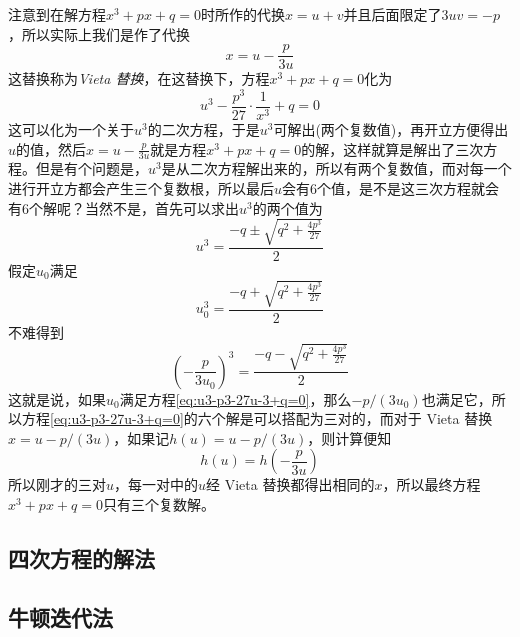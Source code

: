 注意到在解方程$x^3+px+q=0$时所作的代换$x=u+v$并且后面限定了$3uv=-p$，所以实际上我们是作了代换
\begin{equation}
  \label{eq:vieta-substitution}
  x=u-\frac{p}{3u}
\end{equation}
这替换称为\emph{Vieta 替换}，在这替换下，方程$x^3+px+q=0$化为
\begin{equation}
  \label{eq:u3-p3-27u-3+q=0}
  u^3-\frac{p^3}{27}\cdot \frac{1}{x^3}+q=0 
\end{equation}
这可以化为一个关于$u^3$的二次方程，于是$u^3$可解出(两个复数值)，再开立方便得出$u$的值，然后$x=u-\frac{p}{3u}$就是方程$x^3+px+q=0$的解，这样就算是解出了三次方程。但是有个问题是，$u^3$是从二次方程解出来的，所以有两个复数值，而对每一个进行开立方都会产生三个复数根，所以最后$u$会有6个值，是不是这三次方程就会有6个解呢？当然不是，首先可以求出$u^3$的两个值为
\[ u^3=\frac{-q \pm \sqrt{q^2+\frac{4p^3}{27}}}{2} \]
假定$u_0$满足
\[ u_0^3=\frac{-q + \sqrt{q^2+\frac{4p^3}{27}}}{2} \]
不难得到
\[ \left( -\frac{p}{3u_0} \right)^3=\frac{-q - \sqrt{q^2+\frac{4p^3}{27}}}{2} \]
这就是说，如果$u_0$满足方程\ref{eq:u3-p3-27u-3+q=0}，那么$-p/(3u_0)$也满足它，所以方程\ref{eq:u3-p3-27u-3+q=0}的六个解是可以搭配为三对的，而对于 Vieta 替换$x=u-p/(3u)$，如果记$h(u)=u-p/(3u)$，则计算便知
\[ h(u)=h(-\frac{p}{3u}) \]
所以刚才的三对$u$，每一对中的$u$经 Vieta 替换都得出相同的$x$，所以最终方程$x^3+px+q=0$只有三个复数解。

\subsection{四次方程的解法}
\label{sec:solve-equation-with-4-degree}

\subsection{牛顿迭代法}
\label{sec:newton-iterator-method}



